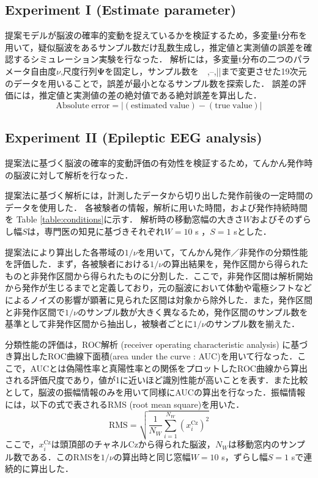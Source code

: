 \documentclass[journal]{IEEEtran}
\begin{document}
\subsection{Experiment I (Estimate parameter) }
提案モデルが脳波の確率的変動を捉えているかを検証するため，多変量t分布を用いて，疑似脳波をあるサンプル数だけ乱数生成し，推定値と実測値の誤差を確認するシミュレーション実験を行なった．
解析には，多変量t分布の二つのパラメータ自由度$\nu$,尺度行列$\mathbf{\Psi}$を固定し，サンプル数を~~,--,||まで変更させた19次元のデータを用いることで，誤差が最小となるサンプル数を探索した．
誤差の評価には，推定値と実測値の差の絶対値である絶対誤差を算出した．
\begin{equation}%
		\mathrm{Absolute\;error} = |\mathrm{(estimated\;value)}-\mathrm{(true\;value)}|
\end{equation}

\subsection{Experiment II (Epileptic EEG analysis)}
提案法に基づく脳波の確率的変動評価の有効性を検証するため，てんかん発作時の脳波に対して解析を行なった．

提案法に基づく解析には，計測したデータから切り出した発作前後の一定時間のデータを使用した．
各被験者の情報，解析に用いた時間，および発作持続時間を Table \ref{table:conditions}に示す．
解析時の移動窓幅の大きさ$W$およびそのずらし幅$S$は，専門医の知見に基づきそれぞれ$W = 10$ s ，$S = 1$ sとした．

提案法により算出した各帯域の$1/\nu$を用いて，てんかん発作／非発作の分類性能を評価した．まず，各被験者における$1/\nu$の算出結果を，発作区間から得られたものと非発作区間から得られたものに分割した．ここで，非発作区間は解析開始から発作が生じるまでと定義しており，元の脳波において体動や電極シフトなどによるノイズの影響が顕著に見られた区間は対象から除外した．また，発作区間と非発作区間で$1/\nu$のサンプル数が大きく異なるため，発作区間のサンプル数を基準として非発作区間から抽出し，被験者ごとに$1/\nu$のサンプル数を揃えた．

分類性能の評価は，ROC解析 (receiver operating characteristic analysis) に基づき算出したROC曲線下面積(area under the curve : AUC)を用いて行なった．ここで，AUCとは偽陽性率と真陽性率との関係をプロットしたROC曲線から算出される評価尺度であり，値が1に近いほど識別性能が高いことを表す．また比較として，脳波の振幅情報のみを用いて同様にAUCの算出を行なった．振幅情報には，以下の式で表されるRMS (root mean square)を用いた\cite{Hamedi2014}．
\begin{equation}%
		\mathrm{RMS} = \sqrt{\frac{1}{N_W} \sum_{i=1}^{N_W} (x_i^\mathrm{Cz})^2}
\end{equation}
ここで，$x_i^\mathrm{Cz}$は頭頂部のチャネルCzから得られた脳波，$N_W$は移動窓内のサンプル数である．このRMSを$1/\nu$の算出時と同じ窓幅$W = 10$ s，ずらし幅$S = 1$ sで連続的に算出した．
\end{document}

